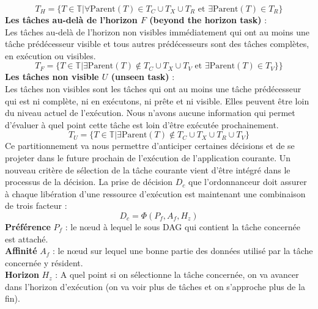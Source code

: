 %
$$
T_H  = \{ T \in \mathbb{T} | \forall \text{Parent}(T) \in T_C \cup T_X  \cup T_R  \text{ et } \exists \text{Parent}(T) \in T_R \}
$$
%
\textbf{Les tâches au-delà de l'horizon $F$ (beyond the horizon task)} :\\  %
Les tâches au-delà de l'horizon non visibles immédiatement qui ont au moins une tâche prédécesseur visible et tous autres prédécesseurs sont des tâches  complètes, en exécution ou visibles. 
%
$$
T_F  = \{ T \in \mathbb{T} | \exists \text{Parent}(T) \notin T_C \cup T_X  \cup T_V  \text{ et } \exists \text{Parent}(T) \in T_V \}\}
$$
%
\textbf{Les tâches non visible $U$ (unseen task)} :\\  %
Les tâches non visibles sont les tâches qui ont au moins une tâche prédécesseur qui est ni complète, ni en exécutons, ni prête et ni visible. Elles peuvent être loin du niveau actuel de l'exécution. Nous n'avons aucune information qui permet d'évaluer à quel point cette tâche est loin d'être exécutée prochainement. 
%
$$
T_U  = \{ T \in \mathbb{T} | \exists \text{Parent}(T) \notin T_C \cup T_X  \cup T_R  \cup T_V \}
$$
%
Ce partitionnement va nous permettre d'anticiper certaines décisions et de se projeter dans le future prochain de l'exécution de l'application courante. Un nouveau critère de sélection de la tâche courante vient d'être intégré dans le processus de la décision. La prise de décision $D_c$ que l'ordonnanceur doit assurer à chaque libération d'une ressource d'exécution est maintenant une combinaison de trois facteur :
$$
D_c = \Phi(P_f , A_f, H_z) 
$$
%
\textbf{Préférence} $P_f$ : le nœud à lequel le sous DAG qui contient la tâche concernée est attaché.\\
\textbf{Affinité} $A_f$ : le nœud sur lequel une bonne partie des données utilisé par la tâche concernée y résident.\\
\textbf{Horizon} $H_z$ : A quel point si on sélectionne la tâche concernée, on va avancer dans l'horizon d'exécution (on va voir plus de tâches et on s'approche plus de la fin). 

